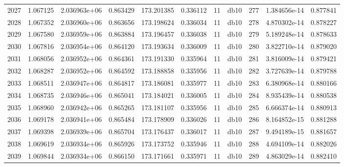 \begin{tabular}{lrrrrrrlrrr}
2027 &    1.067125 &        2.036963e+06 &  0.863429 &              173.201385 &    0.336112 &      11 &         db10 &    277 &   1.384656e-14 &      0.877841 \\
2028 &    1.067352 &        2.036960e+06 &  0.863656 &              173.198624 &    0.336034 &      11 &         db10 &    278 &   4.870302e-14 &      0.878227 \\
2029 &    1.067580 &        2.036959e+06 &  0.863884 &              173.196457 &    0.336038 &      11 &         db10 &    279 &   5.189248e-14 &      0.878633 \\
2030 &    1.067816 &        2.036954e+06 &  0.864120 &              173.193634 &    0.336009 &      11 &         db10 &    280 &   3.822710e-14 &      0.879020 \\
2031 &    1.068056 &        2.036952e+06 &  0.864361 &              173.191330 &    0.335964 &      11 &         db10 &    281 &   3.816009e-14 &      0.879421 \\
2032 &    1.068287 &        2.036952e+06 &  0.864592 &              173.188858 &    0.335956 &      11 &         db10 &    282 &   3.727639e-14 &      0.879788 \\
2033 &    1.068511 &        2.036947e+06 &  0.864817 &              173.186081 &    0.335977 &      11 &         db10 &    283 &   6.380968e-14 &      0.880166 \\
2034 &    1.068735 &        2.036946e+06 &  0.865041 &              173.184021 &    0.336005 &      11 &         db10 &    284 &   8.935439e-14 &      0.880538 \\
2035 &    1.068960 &        2.036942e+06 &  0.865265 &              173.181107 &    0.335956 &      11 &         db10 &    285 &   6.666374e-14 &      0.880913 \\
2036 &    1.069178 &        2.036941e+06 &  0.865484 &              173.178909 &    0.336026 &      11 &         db10 &    286 &   8.164852e-15 &      0.881288 \\
2037 &    1.069398 &        2.036939e+06 &  0.865704 &              173.176437 &    0.336017 &      11 &         db10 &    287 &   9.494189e-15 &      0.881657 \\
2038 &    1.069619 &        2.036934e+06 &  0.865926 &              173.173752 &    0.335946 &      11 &         db10 &    288 &   4.694109e-14 &      0.882026 \\
2039 &    1.069844 &        2.036934e+06 &  0.866150 &              173.171661 &    0.335971 &      11 &         db10 &    289 &   4.863029e-14 &      0.882410 \\

\end{tabular}
